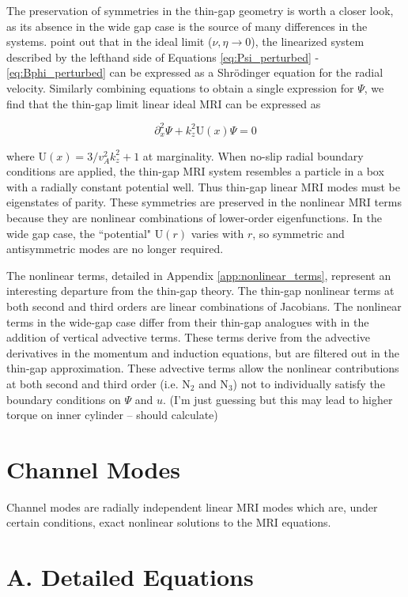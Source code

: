\documentclass[onecolumn]{emulateapj}
\newcommand{\beq}{\begin{equation}}
\newcommand{\eeq}{\end{equation}}
\newcommand{\citei}[1]{\citeauthor{#1} \citeyear{#1}}
\begin{document}
The preservation of symmetries in the thin-gap geometry is worth a closer look, as its absence in the wide gap case is the source of many differences in the systems. \citei{Latter:2015} point out that in the ideal limit ($\nu, \eta \rightarrow 0$), the linearized system described by the lefthand side of Equations \ref{eq:Psi_perturbed} - \ref{eq:Bphi_perturbed} can be expressed as a Shr{\"o}dinger equation for the radial velocity. Similarly combining equations to obtain a single expression for $\Psi$, we find that the thin-gap limit linear ideal MRI can be expressed as

\beq
\partial_x^2 \Psi + k_z^2 \mathrm{U}(x) \Psi = 0
\eeq 

where $\mathrm{U}(x) = {3}/{v_A^2 k_z^2} + 1$ at marginality. When no-slip radial boundary conditions are applied, the thin-gap MRI system resembles a particle in a box with a radially constant potential well. Thus thin-gap linear MRI modes must be eigenstates of parity. These symmetries are preserved in the nonlinear MRI terms because they are nonlinear combinations of lower-order eigenfunctions. In the wide gap case, the ``potential" $\mathrm{U}(r)$ varies with $r$, so symmetric and antisymmetric modes are no longer required.

The nonlinear terms, detailed in Appendix \ref{app:nonlinear_terms}, represent an interesting departure from the thin-gap theory. The thin-gap nonlinear terms at both second and third orders are linear combinations of Jacobians. The nonlinear terms in the wide-gap case differ from their thin-gap analogues with in the addition of vertical advective terms. These terms derive from the advective derivatives in the momentum and induction equations, but are filtered out in the thin-gap approximation. These advective terms allow the nonlinear contributions at both second and third order (i.e. N$_2$ and N$_3$) not to individually satisfy the boundary conditions on $\Psi$ and $u$. (I'm just guessing but this may lead to higher torque on inner cylinder -- should calculate) 

\section{Channel Modes}
Channel modes are radially independent linear MRI modes which are, under certain conditions, exact nonlinear solutions to the MRI equations. 

\clearpage
\appendix

\section{A. Detailed Equations}\label{app:basic_equations}
\end{document}
